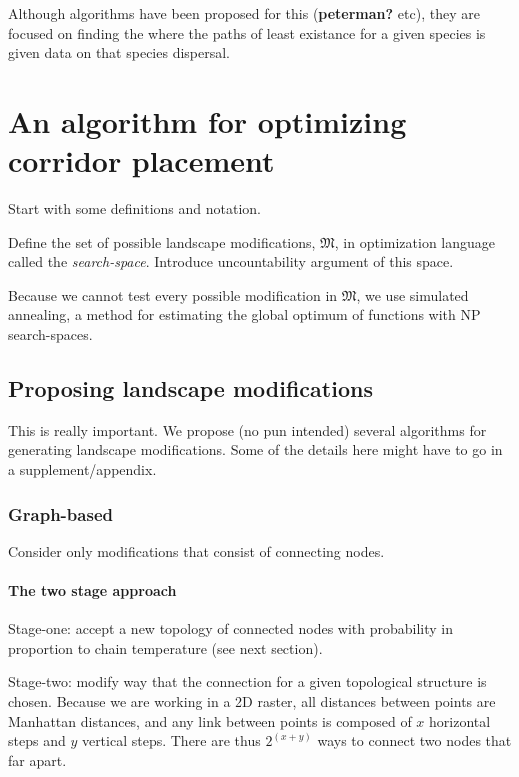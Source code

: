 \documentclass[11pt]{article}
\begin{document}
Although algorithms have been proposed for this (\textbf{peterman?}
etc), they are focused on finding the where the paths of least existance
for a given species is given data on that species dispersal.

\hypertarget{an-algorithm-for-optimizing-corridor-placement}{%
\section{An algorithm for optimizing corridor
placement}\label{an-algorithm-for-optimizing-corridor-placement}}

Start with some definitions and notation.

Define the set of possible landscape modifications, \(\mathfrak{M}\), in
optimization language called the \emph{search-space}. Introduce
uncountability argument of this space.

Because we cannot test every possible modification in \(\mathfrak{M}\),
we use simulated annealing, a method for estimating the global optimum
of functions with NP search-spaces.

\hypertarget{proposing-landscape-modifications}{%
\subsection{Proposing landscape
modifications}\label{proposing-landscape-modifications}}

This is really important. We propose (no pun intended) several
algorithms for generating landscape modifications. Some of the details
here might have to go in a supplement/appendix.

\hypertarget{graph-based}{%
\subsubsection{Graph-based}\label{graph-based}}

Consider only modifications that consist of connecting nodes.

\hypertarget{the-two-stage-approach}{%
\paragraph{The two stage approach}\label{the-two-stage-approach}}

Stage-one: accept a new topology of connected nodes with probability in
proportion to chain temperature (see next section).

Stage-two: modify way that the connection for a given topological
structure is chosen. Because we are working in a 2D raster, all
distances between points are Manhattan distances, and any link between
points is composed of \(x\) horizontal steps and \(y\) vertical steps.
There are thus \(2^{(x+y)}\) ways to connect two nodes that far apart.
\end{document}
